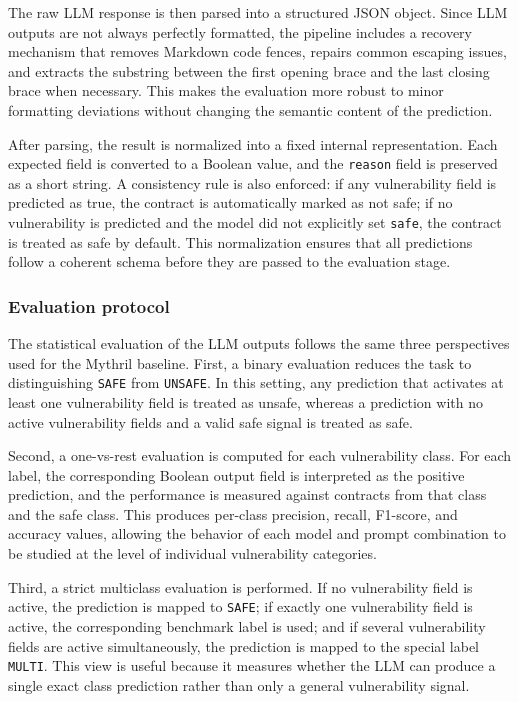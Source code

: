 \documentclass[a4paper,11pt]{article}\usepackage{graphicx} %
\begin{document}
The raw LLM response is then parsed into a structured JSON object. Since LLM outputs are not always perfectly formatted, the pipeline includes a recovery mechanism that removes Markdown code fences, repairs common escaping issues, and extracts the substring between the first opening brace and the last closing brace when necessary. This makes the evaluation more robust to minor formatting deviations without changing the semantic content of the prediction.

After parsing, the result is normalized into a fixed internal representation. Each expected field is converted to a Boolean value, and the \texttt{reason} field is preserved as a short string. A consistency rule is also enforced: if any vulnerability field is predicted as true, the contract is automatically marked as not safe; if no vulnerability is predicted and the model did not explicitly set \texttt{safe}, the contract is treated as safe by default. This normalization ensures that all predictions follow a coherent schema before they are passed to the evaluation stage.

\subsubsection{Evaluation protocol}

The statistical evaluation of the LLM outputs follows the same three perspectives used for the Mythril baseline. First, a binary evaluation reduces the task to distinguishing \texttt{SAFE} from \texttt{UNSAFE}. In this setting, any prediction that activates at least one vulnerability field is treated as unsafe, whereas a prediction with no active vulnerability fields and a valid safe signal is treated as safe.

Second, a one-vs-rest evaluation is computed for each vulnerability class. For each label, the corresponding Boolean output field is interpreted as the positive prediction, and the performance is measured against contracts from that class and the safe class. This produces per-class precision, recall, F1-score, and accuracy values, allowing the behavior of each model and prompt combination to be studied at the level of individual vulnerability categories.

Third, a strict multiclass evaluation is performed. If no vulnerability field is active, the prediction is mapped to \texttt{SAFE}; if exactly one vulnerability field is active, the corresponding benchmark label is used; and if several vulnerability fields are active simultaneously, the prediction is mapped to the special label \texttt{MULTI}. This view is useful because it measures whether the LLM can produce a single exact class prediction rather than only a general vulnerability signal.
\end{document}

